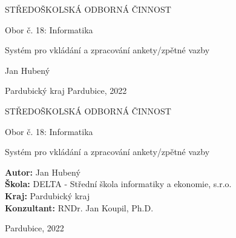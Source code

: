 \begin{titlepage}
    \bfseries{
        \begin{center}
            \LARGE{STŘEDOŠKOLSKÁ ODBORNÁ ČINNOST}

            \vspace{14pt}
            \large{
                Obor č. 18: Informatika
            }

            \vspace{0.4 \textheight}

            \LARGE{
			Systém pro vkládání a zpracování ankety/zpětné vazby
            }

            \vspace{0.3\textheight}
        \end{center}
        
        \noindent\Large{Jan Hubený}

        \noindent\Large{Pardubický kraj   Pardubice, 2022}
        
            
    }
\end{titlepage}

\cleardoublepage

{\bfseries
    \begin{center}
        \LARGE{STŘEDOŠKOLSKÁ ODBORNÁ ČINNOST}

        \vspace{14pt}
        {\large
            Obor č. 18: Informatika
        }

        \vspace{0.3 \textheight}

        \LARGE{
        Systém pro vkládání a zpracování ankety/zpětné vazby
        }


        \vspace{0.24\textheight}
    \end{center}  
}
{\Large
    \noindent\textbf{Autor:} Jan Hubený\\
    \textbf{Škola:} DELTA - Střední škola informatiky a ekonomie, s.r.o.\\
    \textbf{Kraj:} Pardubický kraj\\
    \textbf{Konzultant:} RNDr. Jan Koupil, Ph.D.\\
}

\noindent Pardubice, 2022

\cleardoublepage

